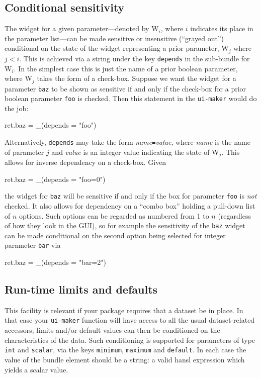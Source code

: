 \documentclass[oneside]{book}
\begin{document}
\subsection{Conditional sensitivity}

The widget for a given parameter---denoted by \textsf{W}$_i$, where
$i$ indicates its place in the parameter list---can be made sensitive
or insensitive (``grayed out'') conditional on the state of the widget
representing a prior parameter, \textsf{W}$_j$ where $j<i$. This is
achieved via a string under the key \texttt{depends} in the sub-bundle
for \textsf{W}$_i$.  In the simplest case this is just the name of a
prior boolean parameter, where \textsf{W}$_j$ takes the form of a
check-box. Suppose we want the widget for a parameter \texttt{baz}
to be shown as sensitive if and only if the check-box for a prior
boolean parameter \texttt{foo} is checked. Then this statement
in the \texttt{ui-maker} would do the job:
\begin{code}
ret.baz = _(depends = "foo")
\end{code}

Alternatively, \texttt{depends} may take the form
\textsl{name}\texttt{=}\textsl{value}, where \textsl{name} is the name
of parameter $j$ and \textit{value} is an integer value indicating the
state of \textsf{W}$_j$.  This allows for inverse dependency on a
check-box.  Given
\begin{code}
ret.baz = _(depends = "foo=0")
\end{code}
the widget for \texttt{baz} will be sensitive if and only if the box
for parameter \texttt{foo} is \textit{not} checked. It also allows for
dependency on a ``combo box'' holding a pull-down list of $n$
options. Such options can be regarded as numbered from 1 to $n$
(regardless of how they look in the GUI), so for example the
sensitivity of the \texttt{baz} widget can be made conditional on the
second option being selected for integer parameter \texttt{bar} via
\begin{code}
ret.baz = _(depends = "bar=2")
\end{code}

\subsection{Run-time limits and defaults}

This facility is relevant if your package requires that a dataset be
in place. In that case your \texttt{ui-maker} function will have
access to all the usual dataset-related accessors; limits and/or
default values can then be conditioned on the characteristics of the
data. Such conditioning is supported for parameters of type
\texttt{int} and \texttt{scalar}, via the keys \texttt{minimum},
\texttt{maximum} and \texttt{default}. In each case the value of the
bundle element should be a string: a valid hansl expression which
yields a scalar value.
\end{document}
